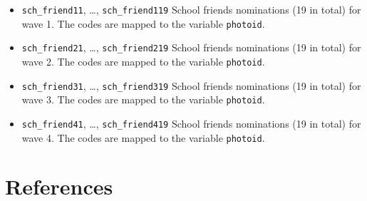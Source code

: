 \documentclass[
]{book}
\begin{document}
\begin{itemize}
\item
  \texttt{sch\_friend11}, \ldots, \texttt{sch\_friend119} School friends nominations (19 in total)
  for wave 1. The codes are mapped to the variable \texttt{photoid}.
\item
  \texttt{sch\_friend21}, \ldots, \texttt{sch\_friend219} School friends nominations (19 in total)
  for wave 2. The codes are mapped to the variable \texttt{photoid}.
\item
  \texttt{sch\_friend31}, \ldots, \texttt{sch\_friend319} School friends nominations (19 in total)
  for wave 3. The codes are mapped to the variable \texttt{photoid}.
\item
  \texttt{sch\_friend41}, \ldots, \texttt{sch\_friend419} School friends nominations (19 in total)
  for wave 4. The codes are mapped to the variable \texttt{photoid}.
\end{itemize}



\hypertarget{references}{%
\chapter*{References}\label{references}}
\end{document}
